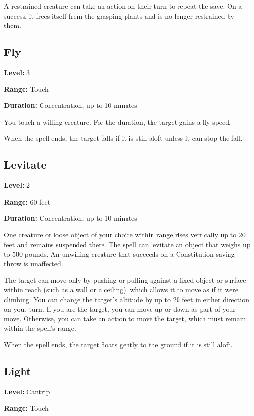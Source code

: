 \documentclass[12pt,letterpaper,twocolumn,openany,nodeprecatedcode,bg=none]{dndbook}
\let\oldsubsection\subsection
\renewcommand{\subsection}[1]{%
  \needspace{5\baselineskip}%
  \oldsubsection{#1}%
}
\begin{document}
A restrained creature can take an action on their turn to repeat the
save. On a success, it frees itself from the grasping plants and is no
longer restrained by them.

\subsection{Fly}\label{fly}

\textbf{Level:} 3

\textbf{Range:} Touch

\textbf{Duration:} Concentration, up to 10 minutes

You touch a willing creature. For the duration, the target gains a fly
speed.

When the spell ends, the target falls if it is still aloft unless it can
stop the fall.

\subsection{Levitate}\label{levitate}

\textbf{Level:} 2

\textbf{Range:} 60 feet

\textbf{Duration:} Concentration, up to 10 minutes

One creature or loose object of your choice within range rises
vertically up to 20 feet and remains suspended there. The spell can
levitate an object that weighs up to 500 pounds. An unwilling creature
that succeeds on a Constitution saving throw is unaffected.

The target can move only by pushing or pulling against a fixed object or
surface within reach (such as a wall or a ceiling), which allows it to
move as if it were climbing. You can change the target's altitude by up
to 20 feet in either direction on your turn. If you are the target, you
can move up or down as part of your move. Otherwise, you can take an
action to move the target, which must remain within the spell's range.

When the spell ends, the target floats gently to the ground if it is
still aloft.

\subsection{Light}\label{light}

\textbf{Level:} Cantrip

\textbf{Range:} Touch
\end{document}
